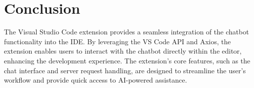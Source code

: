 \section{Conclusion}

The Visual Studio Code extension provides a seamless integration of the chatbot functionality into the IDE. By leveraging the VS Code API and Axios, the extension enables users to interact with the chatbot directly within the editor, enhancing the development experience. The extension's core features, such as the chat interface and server request handling, are designed to streamline the user's workflow and provide quick access to AI-powered assistance.
